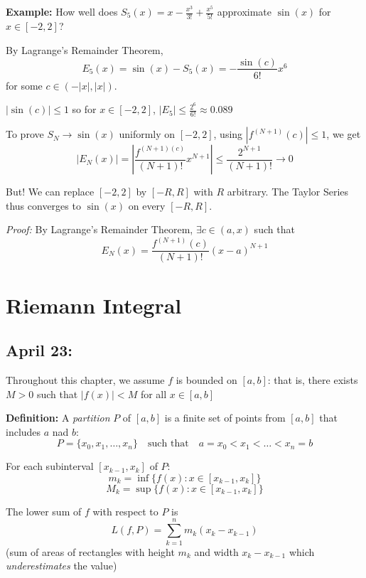 \documentclass[12pt]{report}
\newcommand{\R}{\mathbb{R}}
\newcommand{\abs}[1]{\left\vert #1 \right\vert}
\newenvironment*{tbox}[2][gray]{
    \begin{tcolorbox}[
        parbox=false,
        colback=#1!5!white,
        colframe=#1!75!black,
        breakable,
        title={#2}
    ]}
    {\end{tcolorbox}}
\begin{document}
        \textbf{Example:} How well does $S_5(x) = x - \frac{x^3}{3!} + \frac{x^5}{5!}$ approximate $\sin(x)$ for $x \in [-2, 2]$?

        By Lagrange's Remainder Theorem, 
        \[E_5(x) = \sin(x) - S_5(x) = -\frac{\sin(c)}{6!}x^6\]
        for some $c \in (-\abs{x}, \abs{x})$. 

        $\abs{\sin(c)} \leq 1$ so for $x \in [-2, 2]$, $\abs{E_5} \leq \frac{2^6}{6!} \approx 0.089$

        To prove $S_N \to \sin(x)$ uniformly on $[-2, 2]$, using $\abs{f^{(N+1)}(c)}\leq 1$, we get 
        \[\abs{E_N(x)} = \abs{\frac{f^{(N+1)(c)}}{(N+1)!} x^{N+1}} \leq \frac{2^{N+1}}{(N+1)!} \to 0\]

        But! We can replace $[-2, 2]$ by $[-R, R]$ with $R$ arbitrary. The Taylor Series thus converges to $\sin(x)$ on every $[-R, R]$.

        \begin{tbox}{\textbf{Theorem:} If $f$ is defined in some neighborhood of $a \in \R$ and infinitely differentiable at $a$, then 
            \[\sum_{n=0}^\infty c_n(x - a), \quad c_n = \frac{f^{(n)}(a)}{n!}\]}
            \emph{Proof:} By Lagrange's Remainder Theorem, $\exists c \in (a, x)$ such that 
            \[E_N(x) = \frac{f^{(N+1)}(c)}{(N+1)!}(x - a)^{N+1}\]
        \end{tbox}

\chapter{Riemann Integral}
\section{April 23:}
    Throughout this chapter, we assume $f$ is bounded on $[a, b]$: that is, there exists $M > 0$ such that $\abs{f(x)} < M$ for all $x \in [a, b]$

    \textbf{Definition:} A \emph{partition} $P$ of $[a, b]$ is a finite set of points from $[a, b]$ that includes $a$ nad $b$: 
    \[P = \{x_0, x_1, \dots, x_n\} \quad \text{such that} \quad a = x_0 < x_1 < \dots < x_n = b\]

    For each subinterval $[x_{k-1}, x_k]$ of $P$: 
    \[m_k = \inf\{f(x): x \in [x_{k-1}, x_k]\}\]
    \[M_k = \sup\{f(x): x \in [x_{k-1}, x_k]\}\]

    The lower sum of $f$ with respect to $P$ is 
    \[L(f, P) = \sum_{k=1}^n m_k(x_k - x_{k-1})\] 
    (sum of areas of rectangles with height $m_k$ and width $x_k - x_{k-1}$ which \emph{underestimates} the value)
\end{document}
